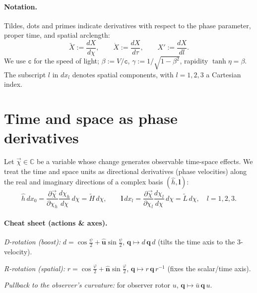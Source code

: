 \documentclass[11pt]{article}
\numberwithin{equation}{section}
\begin{document}
\paragraph{Notation.} Tildes, dots and primes indicate derivatives with respect to the phase parameter, proper time, and spatial arclength:
\[
\tilde{X}:=\frac{dX}{d\chi},\qquad \dot{X}:=\frac{dX}{d\tau},\qquad X':=\frac{dX}{dl}.
\]
We use $\mathtt{c}$ for the speed of light; $\beta:=V/\mathtt{c}$, $\gamma:=1/\sqrt{1-\beta^2}$, rapidity $\tanh\eta=\beta$. The subscript $l$ in $dx_l$ denotes spatial components, with $l=1,2,3$ a Cartesian index.

\section{Time and space as phase derivatives}
Let $\vec{\chi}\in\mathbb{C}$ be a variable whose change generates observable time-space effects. We treat the time and space units as directional derivatives (phase velocities) along the real and imaginary directions of a complex basis $(\hat{h},\mathbf{l})$:
\begin{equation}
\hat{h}\,dx_0=\frac{\partial\vec{\chi}}{\partial\chi_h}\frac{d\chi_h}{d\chi}\,d\chi
=\tilde{H}\,d\chi,\qquad
\mathbf{l}\,dx_l=\frac{\partial\vec{\chi}}{\partial\chi_l}\frac{d\chi_l}{d\chi}\,d\chi
=\tilde{L}\,d\chi,\quad l=1,2,3.
\label{eq:11}
\end{equation}

\paragraph{Cheat sheet (actions \& axes).}
\emph{D-rotation (boost):} $d=\cos\frac{\psi}{2}+\hat{\mathbf u}\sin\frac{\psi}{2}$,\quad
$\displaystyle \mathbf q \mapsto d\,\mathbf q\,d$ (tilts the time axis to the 3-velocity).

\emph{R-rotation (spatial):} $r=\cos\frac{\varphi}{2}+\hat{\mathbf n}\sin\frac{\varphi}{2}$,\quad
$\displaystyle \mathbf q \mapsto r\,\mathbf q\,r^{-1}$ (fixes the scalar/time axis).

\emph{Pullback to the observer's curvature:} for observer rotor $u$,
$\displaystyle \mathbf q \mapsto \bar u\, \mathbf q\, u$.
\end{document}
